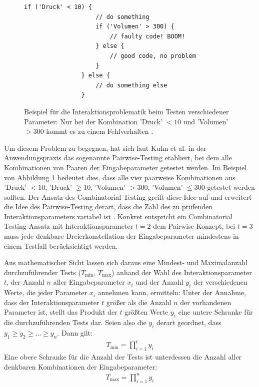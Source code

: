 \begin{figure}[]
\lstset{language=Java}
\begin{lstlisting}[frame=single]
				if ('Druck' < 10) {
					// do something
					if ('Volumen' > 300) {
						// faulty code! BOOM!
					} else {
						// good code, no problem
					}
				} else {
					// do something else
				}
\end{lstlisting}
\caption{Beispiel für die Interaktionsproblematik beim Testen verschiedener Parameter: Nur bei der Kombination 'Druck' $< 10$ und 'Volumen' $> 300$ kommt es zu einem Fehlverhalten \cite{kuhn2010practical}.}
\label{fig:pairwise}
\end{figure}

Um diesem Problem zu begegnen, hat sich laut Kuhn et al. \cite{kuhn2010practical} in der Anwendungspraxis das sogenannte Pairwise-Testing etabliert, bei dem alle Kombinationen von Paaren der Eingabeparameter getestet werden. Im Beispiel von Abbildung \ref{fig:pairwise} bedeutet dies, dass alle vier paarweise Kombinationen aus 'Druck' $< 10$, 'Druck' $\geq 10$, 'Volumen' $> 300$, 'Volumen' $\leq 300$ getestet werden sollten. Der Ansatz des Combinatorial Testing greift diese Idee auf und erweitert die Idee des Pairwise-Testing derart, dass die Zahl des zu prüfenden Interaktionsparameters variabel ist \cite{kuhn2010practical}. Konkret entspricht ein Combinatorial Testing-Ansatz mit Interaktionsparameter $t=2$ dem Pairwise-Konzept, bei $t=3$ muss jede denkbare Dreierkonstellation der Eingabeparameter mindestens in einem Testfall berücksichtigt werden. 

Aus mathematischer Sicht lassen sich daraus eine Mindest- und Maximalanzahl durchzuführender Tests ($T_{\min}$, $T_{\max}$) anhand der Wahl des Interaktionsparameter $t$, der Anzahl $n$ aller Eingabeparameter $x_i$ und der Anzahl $y_i$ der verschiedenen Werte, die jeder Parameter $x_i$ annehmen kann, ermitteln: Unter der Annahme, dass der Interaktionsparameter $t$ größer als die Anzahl $n$ der vorhandenen Parameter ist, stellt das Produkt der $t$ größten Werte $y_i$ eine untere Schranke für die durchzuführenden Tests dar. Seien also die $y_i$ derart geordnet, dass $y_1 \geq y_2 \geq \dots \geq y_n$. Dann gilt:
\begin{gather}
T_{\min} = \prod_{i = 1}^{t} y_i
\end{gather}
Eine obere Schranke für die Anzahl der Tests ist unterdessen die Anzahl aller denkbaren Kombinationen der Eingabeparameter:
\begin{gather}
T_{\max} = \prod_{i=1}^{n} y_i
\end{gather}

